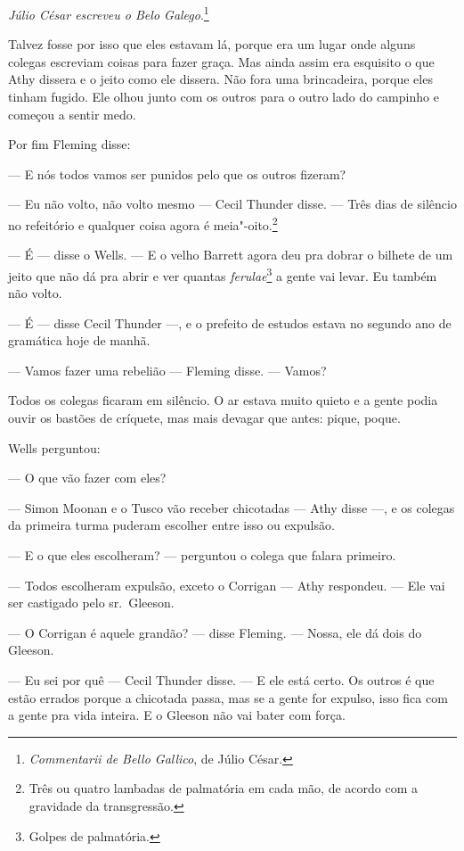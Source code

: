 \textit{Júlio César escreveu o Belo Galego}.\footnote{
\textit{Commentarii de Bello Gallico}, de Júlio César.}

Talvez fosse por isso que eles estavam lá, porque era um lugar onde
alguns colegas escreviam coisas para fazer graça. Mas ainda assim era
esquisito o que Athy dissera e o jeito como ele dissera. Não fora uma
brincadeira, porque eles tinham fugido. Ele olhou junto com os outros
para o outro lado do campinho e começou a sentir medo.

Por fim Fleming disse:

 --- E nós todos vamos ser punidos pelo que os outros fizeram?

 --- Eu não volto, não volto mesmo --- Cecil Thunder disse. --- 
Três dias de silêncio no refeitório e qualquer coisa agora é meia"-oito.\footnote{ Três ou quatro lambadas de palmatória em cada mão, de acordo com a gravidade da transgressão.}

 --- É --- disse o Wells. --- E o velho Barrett agora deu pra dobrar o bilhete de
um jeito que não dá pra abrir e ver quantas \textit{ferulae}\footnote{ Golpes de palmatória.} 
a gente vai levar. Eu também não volto.

 --- É --- disse Cecil Thunder ---, e o prefeito de estudos estava no segundo ano
de gramática hoje de manhã.

 --- Vamos fazer uma rebelião --- Fleming disse. --- Vamos?

Todos os colegas ficaram em silêncio. O ar estava muito quieto e a gente
podia ouvir os bastões de críquete, mas mais devagar que antes: pique,
poque.

Wells perguntou:

 --- O que vão fazer com eles?

 --- Simon Moonan e o Tusco vão receber chicotadas --- Athy disse ---, e os
colegas da primeira turma puderam escolher entre isso ou expulsão.

 --- E o que eles escolheram? --- perguntou o colega que falara primeiro.

 --- Todos escolheram expulsão, exceto o Corrigan --- Athy respondeu. --- Ele vai
ser castigado pelo sr.~Gleeson.

 --- O Corrigan é aquele grandão? --- disse Fleming. --- Nossa, ele dá dois do
Gleeson.

 --- Eu sei por quê --- Cecil Thunder disse. --- E ele está certo. Os outros é que
estão errados porque a chicotada passa, mas se a gente for expulso,
isso fica com a gente pra vida inteira. E o Gleeson não vai bater com
força.

